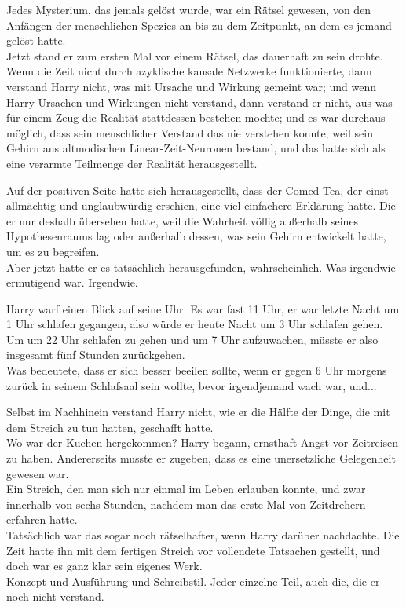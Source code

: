 {Jedes Mysterium, das jemals gelöst wurde, war ein Rätsel gewesen, von den Anfängen der menschlichen Spezies an bis zu dem Zeitpunkt, an dem es jemand gelöst hatte.\\ Jetzt stand er zum ersten Mal vor einem Rätsel, das dauerhaft zu sein drohte. Wenn die Zeit nicht durch azyklische kausale Netzwerke funktionierte, dann verstand Harry nicht, was mit Ursache und Wirkung gemeint war; und wenn Harry Ursachen und Wirkungen nicht verstand, dann verstand er nicht, aus was für einem Zeug die Realität stattdessen bestehen mochte; und es war durchaus möglich, dass sein menschlicher Verstand das nie verstehen konnte, weil sein Gehirn aus altmodischen Linear-Zeit-Neuronen bestand, und das hatte sich als eine verarmte Teilmenge der Realität herausgestellt.

Auf der positiven Seite hatte sich herausgestellt, dass der Comed-Tea, der einst allmächtig und unglaubwürdig erschien, eine viel einfachere Erklärung hatte. Die er nur deshalb übersehen hatte, weil die Wahrheit völlig außerhalb seines Hypothesenraums lag oder außerhalb dessen, was sein Gehirn entwickelt hatte, um es zu begreifen.\\ Aber jetzt hatte er es tatsächlich herausgefunden, wahrscheinlich. Was irgendwie ermutigend war. Irgendwie.

Harry warf einen Blick auf seine Uhr. Es war fast 11 Uhr, er war letzte Nacht um 1 Uhr schlafen gegangen, also würde er heute Nacht um 3 Uhr schlafen gehen.\\ Um um 22 Uhr schlafen zu gehen und um 7 Uhr aufzuwachen, müsste er also insgesamt fünf Stunden zurückgehen.\\ Was bedeutete, dass er sich besser beeilen sollte, wenn er gegen 6 Uhr morgens zurück in seinem Schlafsaal sein wollte, bevor irgendjemand wach war, und...

Selbst im Nachhinein verstand Harry nicht, wie er die Hälfte der Dinge, die mit dem Streich zu tun hatten, geschafft hatte.\\ Wo war der Kuchen hergekommen? Harry begann, ernsthaft Angst vor Zeitreisen zu haben. Andererseits musste er zugeben, dass es eine unersetzliche Gelegenheit gewesen war.\\ Ein Streich, den man sich nur einmal im Leben erlauben konnte, und zwar innerhalb von sechs Stunden, nachdem man das erste Mal von Zeitdrehern erfahren hatte.\\ Tatsächlich war das sogar noch rätselhafter, wenn Harry darüber nachdachte. Die Zeit hatte ihn mit dem fertigen Streich vor vollendete Tatsachen gestellt, und doch war es ganz klar sein eigenes Werk.\\ Konzept und Ausführung und Schreibstil. Jeder einzelne Teil, auch die, die er noch nicht verstand.

}
